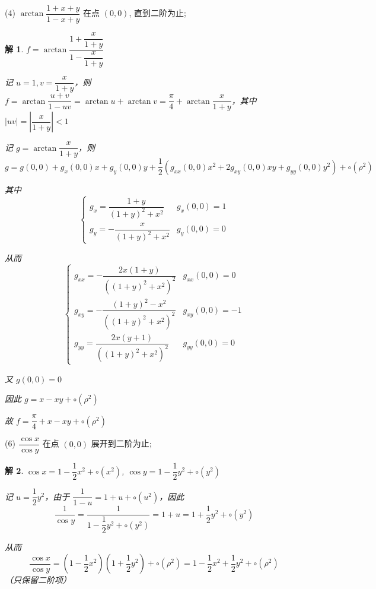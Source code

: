 \documentclass[a4paper,12pt]{article}
\newtheorem*{sol}{解}
\begin{document}
(4) $\arctan \dfrac{1+x+y}{1-x+y}$ 在点 $(0,0)$, 直到二阶为止;
\begin{sol}
    $f=\arctan\dfrac{1+\dfrac{x}{1+y}}{1-\dfrac{x}{1+y}}$

    记 $u=1,v=\dfrac{x}{1+y}$，则 $f=\arctan\dfrac{u+v}{1-uv}=\arctan u+\arctan v=\dfrac{\pi}{4}+\arctan\dfrac{x}{1+y}$，其中 $|uv|=\left|\dfrac{x}{1+y}\right|<1$

    记 $g=\arctan\dfrac{x}{1+y}$，则
    $$
        g=g(0,0)+g_x(0,0)x+g_y(0,0)y+\dfrac{1}{2}\left(g_{xx}(0,0)x^2+2g_{xy}(0,0)xy+g_{yy}(0,0)y^2\right)+\circ(\rho^2)
    $$

    其中
    $$
        \begin{cases}
            g_x=\dfrac{1+y}{(1+y)^2+x^2} & g_x(0,0)=1 \\
            g_y=-\dfrac{x}{(1+y)^2+x^2}  & g_y(0,0)=0
        \end{cases}
    $$

    从而
    $$
        \begin{cases}
            g_{xx}=-\dfrac{2x(1+y)}{((1+y)^2+x^2)^2}     & g_{xx}(0,0)=0  \\
            g_{xy}=-\dfrac{(1+y)^2-x^2}{((1+y)^2+x^2)^2} & g_{xy}(0,0)=-1 \\
            g_{yy}=\dfrac{2x(y+1)}{((1+y)^2+x^2)^2}      & g_{yy}(0,0)=0
        \end{cases}
    $$

    又 $g(0,0)=0$

    因此 $g=x-xy+\circ(\rho^2)$

    故 $f=\dfrac{\pi}{4}+x-xy+\circ(\rho^2)$
\end{sol}

(6) $\dfrac{\cos x}{\cos y}$ 在点 $(0,0)$ 展开到二阶为止;
\begin{sol}
    $\cos x=1-\dfrac{1}{2}x^2+\circ(x^2)$, $\cos y=1-\dfrac{1}{2}y^2+\circ(y^2)$

    记 $u=\dfrac{1}{2}y^2$，由于 $\dfrac{1}{1-u}=1+u+\circ(u^2)$，因此
    $$
        \dfrac{1}{\cos y}=\dfrac{1}{1-\dfrac{1}{2}y^2+\circ(y^2)}=1+u=1+\dfrac{1}{2}y^2+\circ(y^2)
    $$

    从而
    $$
        \dfrac{\cos x}{\cos y}=\left(1-\dfrac{1}{2}x^2\right)\left(1+\dfrac{1}{2}y^2\right)+\circ(\rho^2)=1-\dfrac{1}{2}x^2+\dfrac{1}{2}y^2+\circ(\rho^2)
    $$
    （只保留二阶项）
\end{sol}
\end{document}
